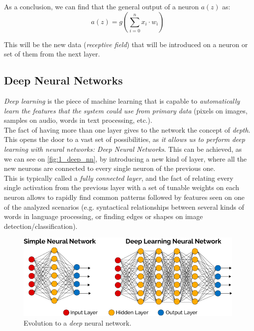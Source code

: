 \begin{enumerate}
	As a conclusion, we can find that the general output of a neuron $a(z)$ as:
	\begin{equation}
		a(z) = g(\sum_{i=0}^{n}x_i \cdot w_i)
	\end{equation}
	
	This will be the new data (\emph{receptive field}) that will be introduced on a neuron or set of them from the next layer.
\end{enumerate}

\subsection{Deep Neural Networks}

\emph{Deep learning} is the piece of machine learning that is capable to \textit{automatically learn the features that the system could use from primary data} (pixels on images, samples on audio, words in text processing, etc.).\\

The fact of having more than one layer gives to the network the concept of \emph{depth}. This opens the door to a vast set of possibilities, as \textit{it allows us to perform deep learning with neural networks: Deep Neural Networks}. This can be achieved, as we can see on \autoref{fig:1_deep_nn}, by introducing a new kind of layer, where all the new neurons are connected to every single neuron of the previous one.\\
This is typically called a \textit{fully connected layer}, and the fact of relating every single activation from the previous layer with a set of tunable weights on each neuron allows to rapidly find common patterns followed by features seen on one of the analyzed scenarios (e.g. syntactical relationships between several kinds of words in language processing, or finding edges or shapes on image detection/classification).

\begin{figure}[h]
	\centering
	\includegraphics[width=0.9\linewidth]{images/deep_neural_network}
	\caption{Evolution to a \textit{deep} neural network.}
	\label{fig:1_deep_nn}
\end{figure}

